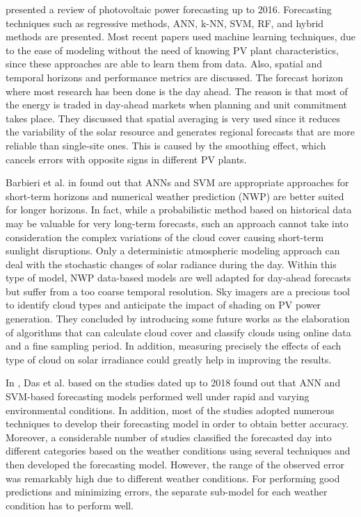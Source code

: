 \cite{ANTONANZAS201678} presented a review of photovoltaic power forecasting up to 2016.
Forecasting techniques such as regressive methods, ANN, k-NN, SVM, RF, and hybrid methods are presented.
Most recent papers used machine learning techniques, due to the ease of modeling without the need of knowing PV plant characteristics, since these approaches are able to learn them from data.
Also, spatial and temporal horizons and performance metrics are discussed.
The forecast horizon where most research has been done is the day ahead.
The reason is that most of the energy is traded in day-ahead markets when planning and unit commitment takes place.
They discussed that spatial averaging is very used since it reduces the variability of the solar resource and generates regional forecasts that are more reliable than single-site ones.
This is caused by the smoothing effect, which cancels errors with opposite signs in different PV plants.

Barbieri et al. in \cite{BARBIERI2017242} found out that ANNs and SVM are appropriate approaches for short-term horizons and numerical weather prediction (NWP) are better suited for longer horizons.
In fact, while a probabilistic method based on historical data may be valuable for very long-term forecasts, such an approach cannot take into consideration the complex variations of the cloud cover causing short-term sunlight disruptions.
Only a deterministic atmospheric modeling approach can deal with the stochastic changes of solar radiance during the day.
Within this type of model, NWP data-based models are well adapted for day-ahead forecasts but suffer from a too coarse temporal resolution.
Sky imagers are a precious tool to identify cloud types and anticipate the impact of shading on PV power generation.
They concluded by introducing some future works as the elaboration of algorithms that can calculate cloud cover and classify clouds using online data and a fine sampling period.
In addition, measuring precisely the effects of each type of cloud on solar irradiance could greatly help in improving the results.

In \cite{DAS2018912}, Das et al. based on the studies dated up to 2018 found out that ANN and SVM-based forecasting models performed well under rapid and varying environmental conditions.
In addition, most of the studies adopted numerous techniques to develop their forecasting model in order to obtain better accuracy.
Moreover, a considerable number of studies classified the forecasted day into different categories based on the weather conditions using several techniques and then developed the forecasting model.
However, the range of the observed error was remarkably high due to different weather conditions.
For performing good predictions and minimizing errors, the separate sub-model for each weather condition has to perform well.


